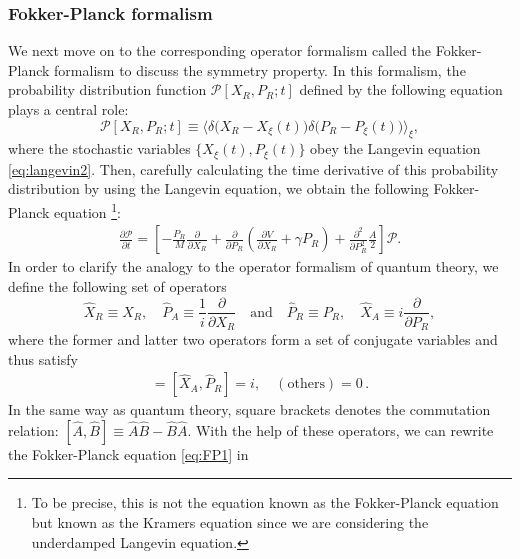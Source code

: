 \documentclass[a4paper,11pt]{article}
\newcommand{\Pcal}{{\mathcal{P}}}
\begin{document}
\subsubsection{Fokker-Planck formalism}
We next move on to the corresponding operator formalism
called the Fokker-Planck formalism
to discuss the symmetry property.
In this formalism, the probability distribution function 
$\Pcal[X_R,P_R;t]$ defined by the following equation
plays a central role:
\begin{equation}
 \Pcal[X_R,P_R;t] 
  \equiv 
  \big\langle \delta \big(X_R - X_\xi (t) \big) 
  \delta \big( P_R - P_\xi(t)  \big) \big\rangle_\xi,
\end{equation}
where the stochastic variables $\{X_\xi (t),P_\xi (t)\}$ obey the Langevin equation \eqref{eq:langevin2}.
Then, carefully calculating the time derivative of this probability 
distribution by using the Langevin equation, 
we obtain the following Fokker-Planck equation%
\footnote{
To be precise, this is not the equation known as the Fokker-Planck equation 
but known as the Kramers equation since we are considering the 
underdamped Langevin equation.
}:
\begin{equation}
 \begin{split}
  \frac{\partial \Pcal}{\partial t} 
  = \left[ -\frac{P_R}{M} \frac{\partial}{\partial X_R} 
  + \frac{\partial}{\partial P_R} 
  \left( \frac{\partial V}{\partial X_R}  + \gamma P_R \right)
  + \frac{\partial^2}{\partial P^2_R} \frac{A}{2} \right] 
  \Pcal .
 \end{split}
 \label{eq:FP1}
\end{equation}
In order to clarify the analogy to the operator formalism 
of quantum theory, we define the following set of operators
\begin{equation}
 \hat{X}_R \equiv X_R, \quad 
  \hat{P}_A \equiv \frac{1}{i}\dfrac{\partial}{\partial X_R}
  \quad \mathrm{and} \quad
  \hat{P}_R \equiv P_R , \quad 
  \hat{X}_A  \equiv i \dfrac{\partial}{\partial P_R} ,
\end{equation}
where the former and latter two operators form a set of conjugate variables 
and thus satisfy
\begin{align}
 [\hat{X}_R, \hat{P}_A] = [\hat{X}_A, \hat{P}_R] = i,  
 \quad 
(\mathrm{others}) = 0  \, .
\end{align}
In the same way as quantum theory, 
square brackets denotes the commutation relation: 
$[\hat{A}, \hat{B}] \equiv \hat{A} \hat{B} - \hat{B} \hat{A}$.
With the help of these operators, 
we can rewrite the Fokker-Planck equation \eqref{eq:FP1} in 
\end{document}
